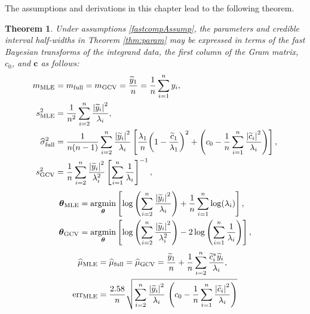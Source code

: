 \documentclass{iitthesis}          %
\newcommand{\bm}[1]{\boldsymbol{#1}}
\newcommand{\vtheta}{{\bm{\theta}}}
\newcommand{\vc}{\bm{c}}
\newcommand{\hmu}{\widehat{\mu}}
\newcommand{\MLE}{\textup{MLE}}
\newcommand{\full}{\textup{full}}
\newcommand{\GCV}{\textup{GCV}}
\newcommand{\err}{\textup{err}}
\def\abs#1{\ensuremath{\left \lvert #1 \right \rvert}}
\providecommand{\argmin}{\operatorname*{argmin}}
\newtheorem{theorem}{Theorem}[section]
\begin{document}
The assumptions and derivations in this chapter lead to the following theorem.

\begin{theorem} \label{thm:fastparam}
	Under assumptions \eqref{fastcompAssump}, the parameters and credible interval half-widths in Theorem \ref{thm:param} may be expressed in terms of the fast Bayesian transforms of the integrand data, the first column of the Gram matrix, $c_0$, and $\vc$ as follows:
	\begin{align}
	\nonumber
	m_\MLE &=  m_{\full} = m_{\GCV} =  \frac{\widetilde{y}_1}{n} = \frac 1n \sum_{i=1}^n y_i,
	\\
	\nonumber
	s^2_\MLE 
	& =
	\frac{1}{n^2} 
	\sum_{i=2}^n \frac{\abs{\widetilde{y}_i}^2}{\lambda_i}, \\
	\nonumber
	\widehat{\sigma}^2_{\textup{full}}
	& =
	\frac{1}{n(n-1)} \sum_{i=2}^n \frac{\abs{\widetilde{y}_i}^2}{\lambda_i}
	\left[\frac{\lambda_1}{n}{\left(1 - \frac{\widetilde{c}_1}{\lambda_1}\right)^2} + \left(c_0  - \frac 1n \sum_{i=1}^n \frac{\abs{\widetilde{c}_i}^2}{\lambda_i}\right) \right], \\
	\nonumber 
	s^2_{\textup{GCV}} & =  \frac 1{n} \sum_{i=2}^n \frac{\abs{\widetilde{y}_i}^2}{\lambda_i^2}  \left [ \sum_{i=1}^n \frac{1}{\lambda_i} \right]^{-1},
	\end{align}
	\begin{subequations}
		\label{fastTheta}
		\begin{align}
		\label{eqn_MLE_loss_func_optimized_2}
		\vtheta_\MLE
		&= 
		\argmin_{\vtheta}
		\left[
		\log\left(
		\sum_{i=2}^n \frac{\abs{\widetilde{y}_i}^2}{\lambda_{i}}
		\right) 
		+ \frac{1}{n}\sum_{i=1}^n \log(\lambda_{i})
		\right],\\
		\label{thetaGCV} 
		\vtheta_{\GCV} 
		&= \argmin_\vtheta \left[ \log \left ( \sum_{i=2}^n \frac{\abs{\widetilde{y}_i}^2}{\lambda_{i}^2} 
		\right)  
		-2\log\left( \sum_{i=1}^n \frac{1}{\lambda_{i}} \right)
		\right], 
		\end{align}
	\end{subequations}
	\begin{align}
	\nonumber
	\hmu_\MLE  &= \hmu_{\full} = \hmu_{\GCV} =
	\frac{\widetilde{y}_1}{n} +
	\frac 1n \sum_{i=2}^n \frac{ \widetilde{c}_i^* \widetilde{y}_i}{\lambda_i}, \\
	\nonumber
	\err_\MLE  &
	=
	\frac{2.58}{n}\sqrt{
		\sum_{i=2}^{n} \frac{\abs{\widetilde{y}_i}^2}{\lambda_i}  
		\,
		\left( c_0 - \frac 1n \sum_{i=1}^n \frac{\abs{\widetilde{c}_i}^2}{\lambda_i} \right) 
}
\end{align}
\end{theorem}
\end{document}
